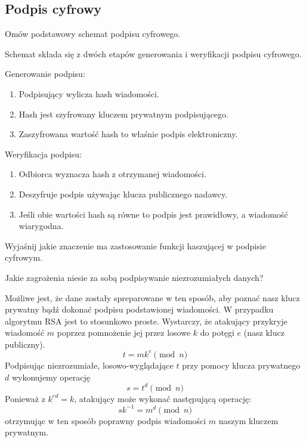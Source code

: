 \documentclass[answers,11pt]{exam}
\begin{document}
\subsection{Podpis cyfrowy}

\begin{questions}

\question Omów podstawowy schemat podpisu cyfrowego.
\begin{solution}
Schemat składa się z dwóch etapów generowania i weryfikacji podpisu cyfrowego.

Generowanie podpisu:
\begin{enumerate}
\item Podpisujący wylicza hash wiadomości.
\item Hash jest szyfrowany kluczem prywatnym podpisującego.
\item Zaszyfrowana wartość hash to właśnie podpis elektroniczny.
\end{enumerate}

Weryfikacja podpisu:
\begin{enumerate}
\item Odbiorca wyznacza hash z otrzymanej wiadomości.
\item Deszyfruje podpis używając klucza publicznego nadawcy.
\item Jeśli obie wartości hash są równe to podpis jest prawidłowy, a wiadomość wiarygodna.
\end{enumerate}
\end{solution}


\question Wyjaśnij jakie znaczenie ma zastosowanie funkcji haszującej w podpisie cyfrowym.
\begin{solution}
\end{solution}


\question Jakie zagrożenia niesie za sobą podpisywanie niezrozumiałych danych?
\begin{solution}
Możliwe jest, że dane zostały spreparowane w ten sposób, aby poznać nasz klucz prywatny bądź dokonać podpisu podstawionej wiadomości. W przypadku algorytmu RSA jest to stosunkowo proste. Wystarczy, że atakujący przykryje wiadomość $m$ poprzez pomnożenie jej przez losowe $k$ do potęgi $e$ (nasz klucz publiczny). 
\begin{equation}
t = m k^e \pmod{n}
\end{equation}
Podpisując niezrozumiałe, losowo-wyglądające $t$ przy pomocy klucza prywatnego $d$ wykonujemy operację
\begin{equation}
s = t^d \pmod{n}
\end{equation}
Ponieważ z $k^{ed} = k$, atakujący może wykonać następującą operację:
\begin{equation}
sk^{-1} = m^d \pmod{n}
\end{equation}
otrzymując w ten sposób poprawny podpis wiadomości $m$ naszym kluczem prywatnym.
\end{solution}

\end{questions}
\end{document}
